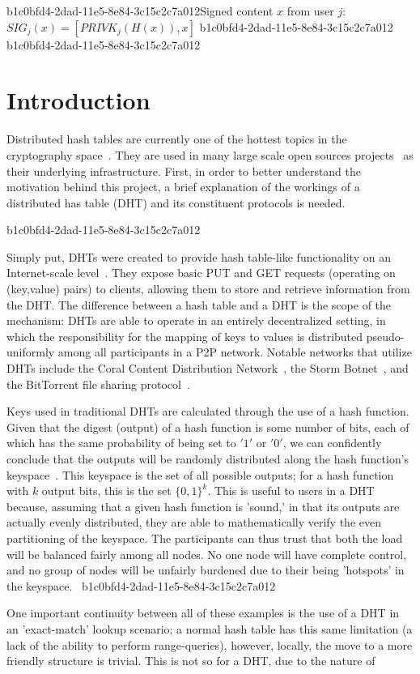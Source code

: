 \documentclass[12pt]{article}
\begin{document}
b1c0bfd4-2dad-11e5-8e84-3c15c2c7a012Signed content $x$ from user $j$: $SIG_j(x) = \left[ PRIVK_j( H(x) ), x \right]$
b1c0bfd4-2dad-11e5-8e84-3c15c2c7a012
b1c0bfd4-2dad-11e5-8e84-3c15c2c7a012\section{Introduction}
\par Distributed hash tables are currently one of the hottest topics in the cryptography space~\cite{Stoica:2001dj,Rowstron:2001ea,Ratnasamy:2001wn}. They are used in many large scale open sources projects~\cite{Freitas:2013tb,Xu:2010vs,Perfitt:2010fh} as their underlying infrastructure. First, in order to better understand the motivation behind this project, a brief explanation of the workings of a distributed has table (DHT) and its constituent protocols is needed.

b1c0bfd4-2dad-11e5-8e84-3c15c2c7a012\par Simply put, DHTs were created to provide hash table-like functionality on an Internet-scale level~\cite{Ratnasamy:2001wn}. They expose basic PUT and GET requests (operating on (key,value) pairs) to clients, allowing them to store and retrieve information from the DHT. The difference between a hash table and a DHT is the scope of the mechanism: DHTs are able to operate in an entirely decentralized setting, in which the responsibility for the mapping of keys to values is distributed pseudo-uniformly among all participants in a P2P network. Notable networks that utilize DHTs include the Coral Content Distribution Network~\cite{Freedman:2004vb}, the Storm Botnet~\cite{Holz:2008uk}, and the BitTorrent file sharing protocol~\cite{Cohen:y1_8mBnw}.

\par Keys used in traditional DHTs are calculated through the use of a hash function. Given that the digest (output) of a hash function is some number of bits, each of which has the same probability of being set to $'1'$ or $'0'$, we can confidently conclude that the outputs will be randomly distributed along the hash function's keyspace~. This keyspace is the set of all possible outputs; for a hash function with $k$ output bits, this is the set $\{0,1\}^k$. This is useful to users in a DHT because, assuming that a given hash function is 'sound,' in that its outputs are actually evenly distributed, they are able to mathematically verify the even partitioning of the keyspace. The participants can thus trust that both the load will be balanced fairly among all nodes. No one node will have complete control, and no group of nodes will be unfairly burdened due to their being 'hotspots' in the keyspace.~
b1c0bfd4-2dad-11e5-8e84-3c15c2c7a012
\par One important continuity between all of these examples is the use of a DHT in an 'exact-match' lookup scenario; a normal hash table has this same limitation (a lack of the ability to perform range-queries), however, locally, the move to a more friendly structure is trivial. This is not so for a DHT, due to the nature of
\printbibliography
\end{document}
